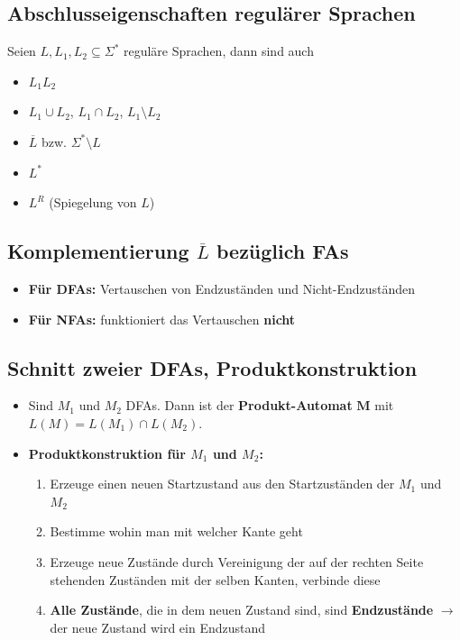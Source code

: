 \documentclass[ieeetran]{article}
\begin{document}
\subsection{Abschlusseigenschaften regulärer Sprachen} %
\label{sub:abschlusseigenschaften_regulärer_sprachen}
Seien $L, L_1, L_2 \subseteq \Sigma^*$ reguläre Sprachen, dann sind auch
\begin{itemize}
  \item $L_1 L_2$
\item $L_1 \cup L_2$, $L_1 \cap L_2$, $L_1 \setminus L_2$
\item $\overline{L}$ bzw. $\Sigma^* \setminus L$

\item $L^*$
\item $L^R$ (Spiegelung von $L$)
\end{itemize}

\subsection{Komplementierung $\overline{L}$ bezüglich FAs} %
\label{sub:komplementierung_bezüglich_fAs}
\begin{itemize}
  \item \textbf{Für DFAs:} Vertauschen von Endzuständen und Nicht-Endzuständen
\item \textbf{Für NFAs:} funktioniert das Vertauschen \textbf{nicht} 
\end{itemize}

\subsection{Schnitt zweier DFAs, Produktkonstruktion} %
\label{sub:produktkonstruktion}
\begin{itemize}
	\item Sind $M_1$ und $M_2$ DFAs. Dann ist der \textbf{Produkt-Automat} $\mathbf{M}$ mit $L(M) = L(M_1) \cap L(M_2)$.

	\item \textbf{Produktkonstruktion für $M_1$ und $M_2$:}
		\begin{enumerate}
			\item Erzeuge einen neuen Startzustand aus den Startzuständen der $M_1$ und $M_2$
			\item Bestimme wohin man mit welcher Kante geht
			\item Erzeuge neue Zustände durch Vereinigung der auf der rechten Seite stehenden Zuständen mit der selben Kanten, verbinde diese
			\item \textbf{Alle Zustände}, die in dem neuen Zustand sind, sind \textbf{Endzustände} $\rightarrow$ der neue Zustand wird ein Endzustand
		\end{enumerate}
\end{itemize}
\end{document}
